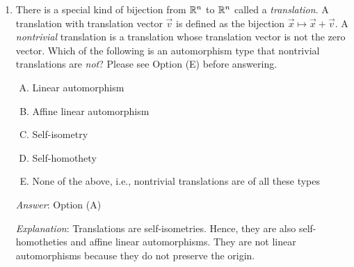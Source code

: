 \documentclass[10pt]{amsart}
\begin{document}
\begin{enumerate}
  \begin{enumerate}[(A)]
  \item Being an affine linear automorphism is precisely the same as
    being a self-isometry.
  \item Every affine linear automorphism is a self-isometry, but not
    every self-isometry is an affine linear automorphism.
  \item Every self-isometry is an affine linear automorphism, but not
    every affine linear automorphism is a self-isometry.
  \item An affine linear automorphism need not be a self-isometry, and
    a self-isometry need not be affine linear.
  \end{enumerate}

  {\em Answer}: Option (C)

  {\em Explanation}: This can be deduced from the two preceding
  questions, and can also be seem directly.

  {\em Performance review}: 18 out of 27 got this. 3 each chose (B)
  and (D), 2 chose (A), 1 left the question blank.

  {\em Historical note (last time)}: $22$ out of $27$ got this. $4$ chose (D),
  $1$ chose (A).
\item There is a special kind of bijection from $\mathbb{R}^n$ to $\mathbb{R}^n$
  called a {\em translation}. A translation with translation vector
  $\vec{v}$ is defined as the bijection $\vec{x} \mapsto \vec{x} +
  \vec{v}$. A {\em nontrivial} translation is a translation whose
  translation vector is not the zero vector. Which of the following is
  an automorphism type that nontrivial translations are {\em not}?
  Please see Option (E) before answering.

  \begin{enumerate}[(A)]
  \item Linear automorphism
  \item Affine linear automorphism
  \item Self-isometry
  \item Self-homothety
  \item None of the above, i.e., nontrivial translations are of all
    these types
  \end{enumerate}

  {\em Answer}: Option (A)

  {\em Explanation}: Translations are self-isometries. Hence, they are
  also self-homotheties and affine linear automorphisms. They are not
  linear automorphisms because they do not preserve the origin.


\end{enumerate}
\end{document}
